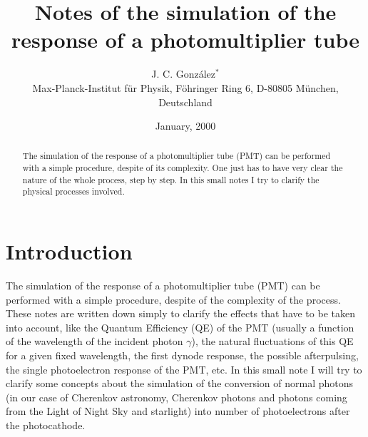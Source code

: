 \documentclass{article}
\def\Cherenkov{Cherenkov\xspace}
\begin{document}

\title{Notes of the simulation of the response of a photomultiplier tube}

\author{J. C. Gonz\'alez$^*$\\%
Max-Planck-Institut f\"ur Physik, %
F\"ohringer Ring 6, D-80805 M\"unchen, Deutschland}


\date{January, 2000}



\begin{abstract}
  The simulation of the response of a photomultiplier tube (PMT) can
  be performed with a simple procedure, despite of its complexity. One
  just has to have very clear the nature of the whole process, step by
  step. In this small notes I try to clarify the physical processes
  involved.
\end{abstract}


\section*{Introduction}

The simulation of the response of a photomultiplier tube (PMT) can be
performed with a simple procedure, despite of the complexity of the
process. These notes are written down simply to clarify the effects
that have to be taken into account, like the Quantum Efficiency (QE)
of the PMT (usually a function of the wavelength of the incident
photon $\gamma$), the natural fluctuations of this QE for a given
fixed wavelength, the first dynode response, the possible
afterpulsing, the single photoelectron response of the PMT, etc. In
this small note I will try to clarify some concepts about the
simulation of the conversion of normal photons (in our case of
\Cherenkov astronomy, \Cherenkov photons and photons coming from the
Light of Night Sky and starlight) into number of photoelectrons after
the photocathode.

\end{document}
